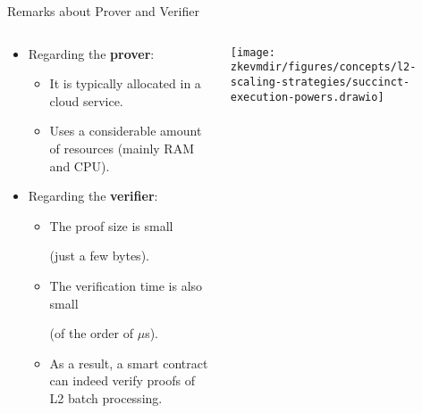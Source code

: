 \begin{frame}[t]{Remarks about Prover and Verifier}
\begin{columns}
\begin{column}{0.55\textwidth}
\begin{itemize}
\item Regarding the \textbf{prover}:
  \begin{itemize}
  \item It is typically allocated in a cloud service.
  \item Uses a considerable amount of resources (mainly RAM and CPU).
  \end{itemize}

\vspace{0.2cm}
\item Regarding the \textbf{verifier}:
  \begin{itemize}
  \item The proof size is small

  (just a few bytes).
  \item The verification time is also small

  (of the order of $\mu$s).
  \item As a result, a smart contract can indeed verify proofs of L2 batch processing.
  \end{itemize}
\end{itemize}
\end{column}
\begin{column}{0.4\textwidth}
\texttt{[image: \\zkevmdir/figures/concepts/l2-scaling-strategies/succinct-execution-powers.drawio]}
\end{column}
\end{columns}
\end{frame}




